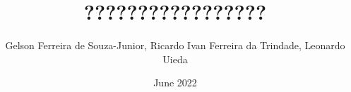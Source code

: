 \documentclass[manuscript,revised]{geophysics}
\begin{document}
\title{?????????????????}
\renewcommand{\thefootnote}{\fnsymbol{footnote}} 

\address{
\footnotemark[1]BP UTG, \\
200 Westlake Park Blvd, \\
Houston, TX, 77079 \\
\footnotemark[2]Bureau of Economic Geology, \\
John A. and Katherine G. Jackson School of Geosciences \\
The University of Texas at Austin \\
University Station, Box X \\
Austin, TX 78713-8924}

\author{Gelson Ferreira de Souza-Junior\footnotemark[1], Ricardo Ivan Ferreira da Trindade\footnotemark[1],  Leonardo Uieda\footnotemark[2]}
\date{June 2022}

\maketitle
\justify



















\end{document}
